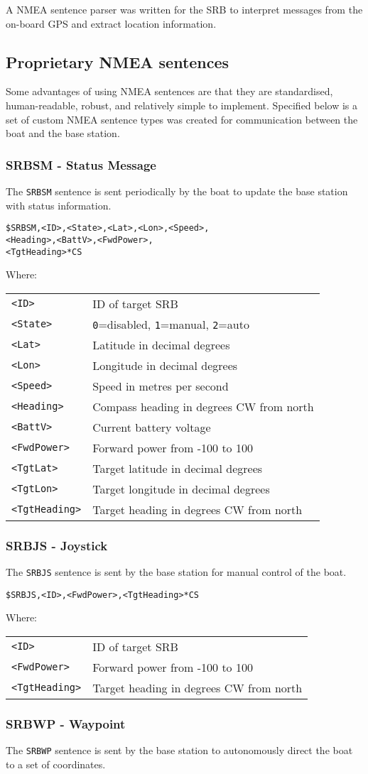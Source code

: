 \documentclass[a4paper]{IEEEtran}
\newenvironment{nmeaspec}[1]
{
\newcommand{\field}[2]{\texttt{##1} & ##2 \\}
\vspace{0.2cm}
\noindent\texttt{#1}
\vspace{0.2cm}

\noindent Where: \vspace{0.1cm}\\  \noindent
\vspace{0.2cm}
\begin{tabular}{ll}
}
{
\end{tabular}
}
\begin{document}
A NMEA sentence parser was written for the SRB to interpret messages from the on-board GPS and extract location information.

\subsection{Proprietary NMEA sentences}
Some advantages of using NMEA sentences are that they are standardised, human-readable, robust, and relatively simple to implement. Specified below is a set of custom NMEA sentence types was created for communication between the boat and the base station.

\subsubsection{SRBSM - Status Message}
The \texttt{SRBSM} sentence is sent periodically by the boat to update the base station with status information.

\begin{nmeaspec}{\$SRBSM,<ID>,<State>,<Lat>,<Lon>,<Speed>,\\<Heading>,<BattV>,<FwdPower>,\\<TgtHeading>*CS}
\field{<ID>}{ID of target SRB}
\field{<State>}{\texttt{0}=disabled, \texttt{1}=manual, \texttt{2}=auto}
\field{<Lat>}{Latitude in decimal degrees}
\field{<Lon>}{Longitude in decimal degrees}
\field{<Speed>}{Speed in metres per second}
\field{<Heading>}{Compass heading in degrees CW from north}
\field{<BattV>}{Current battery voltage}
\field{<FwdPower>}{Forward power from -100 to 100}
\field{<TgtLat>}{Target latitude in decimal degrees}
\field{<TgtLon>}{Target longitude in decimal degrees}
\field{<TgtHeading>}{Target heading in degrees CW from north}
\end{nmeaspec}

\subsubsection{SRBJS - Joystick}
The \texttt{SRBJS} sentence is sent by the base station for manual control of the boat.

\begin{nmeaspec}{\$SRBJS,<ID>,<FwdPower>,<TgtHeading>*CS}
\field{<ID>}{ID of target SRB}
\field{<FwdPower>}{Forward power from -100 to 100}
\field{<TgtHeading>}{Target heading in degrees CW from north}
\end{nmeaspec}

\subsubsection{SRBWP - Waypoint}
The \texttt{SRBWP} sentence is sent by the base station to autonomously direct the boat to a set of coordinates.
\end{document}
